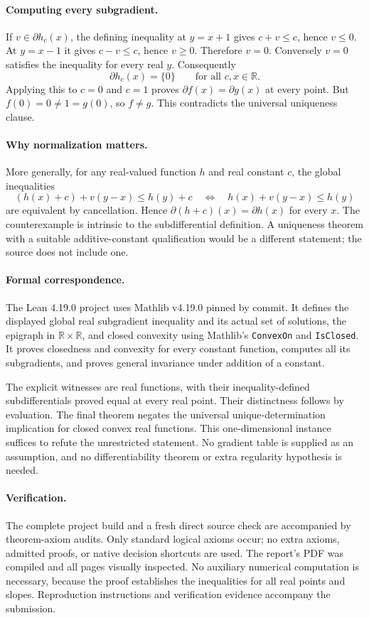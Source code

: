 \documentclass[11pt]{article}
\begin{document}
\paragraph{Computing every subgradient.} If $v\in\partial h_c(x)$, the defining inequality at $y=x+1$ gives $c+v\leq c$, hence $v\leq0$. At $y=x-1$ it gives $c-v\leq c$, hence $v\geq0$. Therefore $v=0$. Conversely $v=0$ satisfies the inequality for every real $y$. Consequently
\[
\partial h_c(x)=\{0\}\qquad\text{for all }c,x\in\mathbb R.
\]
Applying this to $c=0$ and $c=1$ proves $\partial f(x)=\partial g(x)$ at every point. But $f(0)=0\ne1=g(0)$, so $f\ne g$. This contradicts the universal uniqueness clause.

\paragraph{Why normalization matters.} More generally, for any real-valued function $h$ and real constant $c$, the global inequalities
\[
(h(x)+c)+v(y-x)\leq h(y)+c
\quad\Longleftrightarrow\quad
h(x)+v(y-x)\leq h(y)
\]
are equivalent by cancellation. Hence $\partial(h+c)(x)=\partial h(x)$ for every $x$. The counterexample is intrinsic to the subdifferential definition. A uniqueness theorem with a suitable additive-constant qualification would be a different statement; the source does not include one.

\paragraph{Formal correspondence.} The Lean 4.19.0 project uses Mathlib v4.19.0 pinned by commit. It defines the displayed global real subgradient inequality and its actual set of solutions, the epigraph in $\mathbb R\times\mathbb R$, and closed convexity using Mathlib's \texttt{ConvexOn} and \texttt{IsClosed}. It proves closedness and convexity for every constant function, computes all its subgradients, and proves general invariance under addition of a constant.

The explicit witnesses are real functions, with their inequality-defined subdifferentials proved equal at every real point. Their distinctness follows by evaluation. The final theorem negates the universal unique-determination implication for closed convex real functions. This one-dimensional instance suffices to refute the unrestricted statement. No gradient table is supplied as an assumption, and no differentiability theorem or extra regularity hypothesis is needed.

\paragraph{Verification.} The complete project build and a fresh direct source check are accompanied by theorem-axiom audits. Only standard logical axioms occur; no extra axioms, admitted proofs, or native decision shortcuts are used. The report's PDF was compiled and all pages visually inspected. No auxiliary numerical computation is necessary, because the proof establishes the inequalities for all real points and slopes. Reproduction instructions and verification evidence accompany the submission.
\end{document}
